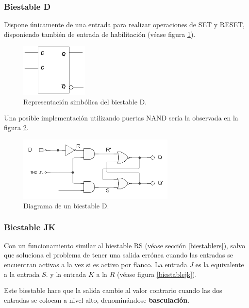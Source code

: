 \documentclass[a4paper, 11pt, titlepage]{article}
\begin{document}
		\subsubsection{Biestable D}

			Dispone únicamente de una entrada para realizar operaciones de SET y RESET, disponiendo 
			también de entrada de habilitación (véase figura \ref{biestabled}).

			\begin{figure}[htp]
				\centering
				\includegraphics[width=0.3\textwidth]{resources/biestabled.jpg}
				\caption{Representación simbólica del biestable D.}
				\label{biestabled}
			\end{figure}

			Una posible implementación utilizando puertas NAND sería la observada en la 
			figura \ref{biestabled2}.

			\begin{figure}[htp]
				\centering
				\includegraphics[width=0.7\textwidth]{resources/biestabled2.png}
				\caption{Diagrama de un biestable D.}
				\label{biestabled2}
			\end{figure}

		\subsubsection{Biestable JK}

			Con un funcionamiento similar al biestable RS (véase sección \ref{biestablers}), 
			salvo que soluciona el problema de tener una salida errónea cuando las entradas se 
			encuentran activas a la vez si es activo por flanco. La entrada $J$ es la equivalente 
			a la entrada $S$. y la entrada $K$ a la $R$ (véase figura \ref{biestablejk}).

			Este biestable hace que la salida cambie al valor contrario cuando las dos entradas 
			se colocan a nivel alto, denominándose \textbf{basculación}.
\end{document}
